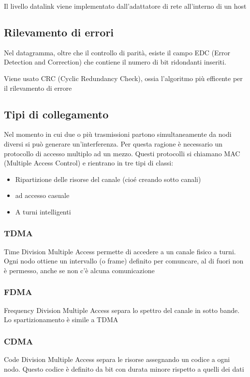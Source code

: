 \documentclass[12pt, a4paper]{article}
\begin{document}
Il livello datalink viene implementato dall'adattatore di rete all'interno di un host

\subsection{Rilevamento di errori}
Nel datagramma, oltre che il controllo di parità, esiste il campo EDC (Error Detection and Correction) 
che contiene il numero di bit ridondanti inseriti. 

Viene usato CRC (Cyclic Redundancy Check), ossia l'algoritmo più efficente per il rilevamento di errore



\subsection{Tipi di collegamento}
Nel momento in cui due o più trasmissioni partono simultaneamente da nodi diversi si può generare un'interferenza.
Per questa ragione è necessario un protocollo di accesso multiplo ad un mezzo. Questi protocolli si chiamano MAC
(Multiple Access Control) e rientrano in tre tipi di classi:
\begin{itemize}
    \item Ripartizione delle risorse del canale (cioé creando sotto canali)
    \item ad accesso casuale
    \item A turni intelligenti
\end{itemize}

\subsubsection{TDMA}
Time Division Multiple Access permette di accedere a un canale fisico a turni. Ogni nodo ottiene un intervallo
(o frame) definito per comuncare, al di fuori non è permesso, anche se non c'è alcuna comunicazione

\subsubsection{FDMA}
Frequency Division Multiple Access separa lo spettro del canale in sotto bande. Lo spartizionamento è simile a
TDMA

\subsubsection{CDMA}
Code Division Multiple Access separa le risorse assegnando un codice a ogni nodo. Questo codice è definito da
bit con durata minore rispetto a quelli dei dati
\end{document}
